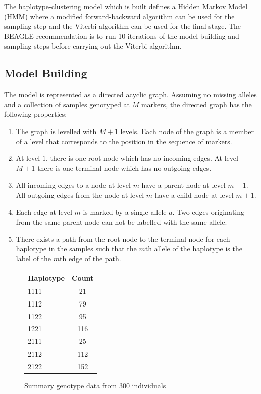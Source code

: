 \documentclass[a4paper,10pt,twoside,abstraction,titlepage]{article}
\begin{document}
The haplotype-clustering model which is built defines a Hidden Markov Model (HMM) where a modified forward-backward algorithm can be used for the sampling step and the Viterbi algorithm can be used for the final stage.  The BEAGLE recommendation is to run 10 iterations of the model building and sampling steps before carrying out the Viterbi algorithm.



\subsection{Model Building}
The model is represented as a directed acyclic graph.  Assuming no missing alleles and a collection of samples genotyped at $M$ markers, the directed graph has the following properties:

\vspace{-5pt}
\begin{enumerate}
\itemsep0pt
\item The graph is levelled with $M+1$ levels. Each node of the graph is a member of a level that corresponds to the position in the sequence of markers.
\item At level $1$, there is one root node which has no incoming edges.  At level $M+1$ there is one terminal node which has no outgoing edges.
\item All incoming edges to a node at level $m$ have a parent node at level $m-1$.  All outgoing edges from the node at level $m$ have a child node at level $m+1$.
\item Each edge at level $m$ is marked by a single allele $a$.  Two edges originating from the same parent node can not be labelled with the same allele.
\item There exists a path from the root node to the terminal node for each haplotype in the samples such that the $m$th allele of the haplotype is the label of the $m$th edge of the path.
\end{enumerate}


\begin{figure}[htp]
\centering
\begin{tabular}{lc}
\toprule
Haplotype & Count \\
\midrule
1111 & 21\\ 
1112 &  79\\
1122 & 95\\
1221 & 116 \\
2111 & 25\\
2112 & 112\\
2122 & 152\\
\bottomrule 
\end{tabular}
\vspace{5pt}
\caption{Summary genotype data from 300 individuals}

\vspace{-5pt}
\end{figure}
\end{document}
